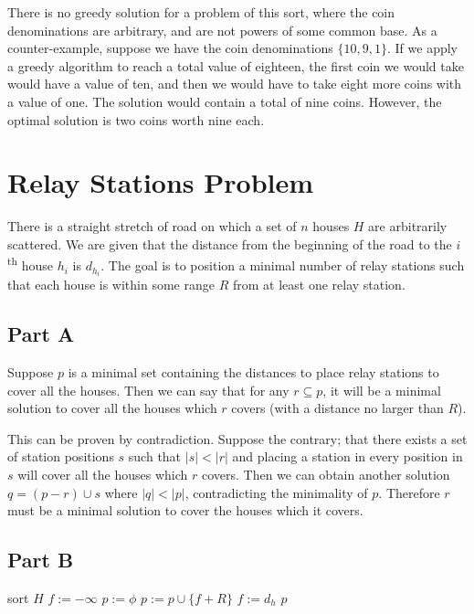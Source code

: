 \documentclass{article}
\begin{document}
There is no greedy solution for a problem of this sort, where the coin denominations are arbitrary, and are not powers of some common base. As a counter-example, suppose we have the coin denominations \(\{10, 9, 1\}\). If we apply a greedy algorithm to reach a total value of eighteen, the first coin we would take would have a value of ten, and then we would have to take eight more coins with a value of one. The solution would contain a total of nine coins. However, the optimal solution is two coins worth nine each.

\section{Relay Stations Problem}

There is a straight stretch of road on which a set of \(n\) houses \(H\) are arbitrarily scattered. We are given that the distance from the beginning of the road to the \(i\)\textsuperscript{th} house \(h_i\) is \(d_{h_i}\). The goal is to position a minimal number of relay stations such that each house is within some range \(R\) from at least one relay station.

\subsection*{Part A}

Suppose \(p\) is a minimal set containing the distances to place relay stations to cover all the houses. Then we can say that for any \(r \subseteq p\), it will be a minimal solution to cover all the houses which \(r\) covers (with a distance no larger than \(R\)).

This can be proven by contradiction. Suppose the contrary; that there exists a set of station positions \(s\) such that \(|s| < |r|\) and placing a station in every position in \(s\) will cover all the houses which \(r\) covers. Then we can obtain another solution \(q = (p - r) \cup s\) where \(|q| < |p|\), contradicting the minimality of \(p\). Therefore \(r\) must be a minimal solution to cover the houses which it covers.

\subsection*{Part B}

\begin{algorithmic}
	\begin{algorithm}
		\State sort \(H\)
		\State \(f := -\infty\)
		\State \(p := \phi\)
		\State \(p := p \cup \{f + R\}\)
		\State \(f := d_h\)
		\EndIf
		\EndFor
		\Return \(p\)
		\EndFunction
	\end{algorithm}
\end{algorithmic}
\end{document}
